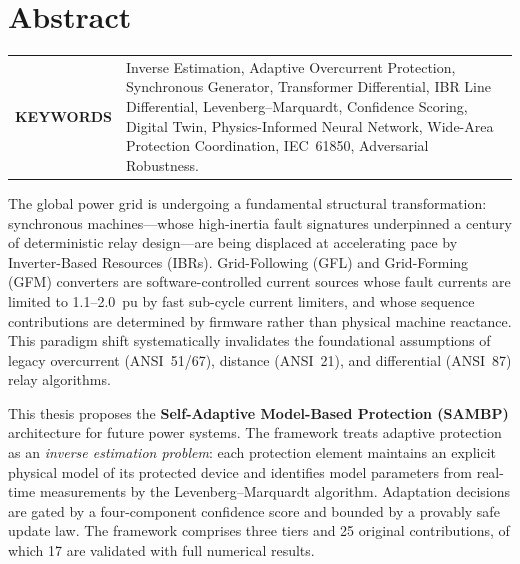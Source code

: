 \chapter{Abstract}

\begin{tabular}{@{} >{\bfseries}p{} p{} @{}}
\MakeUppercase{Keywords} &
Inverse Estimation, Adaptive Overcurrent Protection, Synchronous Generator,
Transformer Differential, IBR Line Differential, Levenberg--Marquardt,
Confidence Scoring, Digital Twin, Physics-Informed Neural Network,
Wide-Area Protection Coordination, IEC~61850, Adversarial Robustness.
\end{tabular}
\par

\begin{doublespacing}

The global power grid is undergoing a fundamental structural transformation:
synchronous machines---whose high-inertia fault signatures underpinned a century
of deterministic relay design---are being displaced at accelerating pace by
Inverter-Based Resources (IBRs). Grid-Following (GFL) and Grid-Forming (GFM)
converters are software-controlled current sources whose fault currents are
limited to 1.1--2.0~pu by fast sub-cycle current limiters, and whose sequence
contributions are determined by firmware rather than physical machine reactance.
This paradigm shift systematically invalidates the foundational assumptions of
legacy overcurrent (ANSI~51/67), distance (ANSI~21), and differential (ANSI~87)
relay algorithms.

This thesis proposes the \textbf{Self-Adaptive Model-Based Protection (SAMBP)}
architecture for future power systems. The framework treats adaptive protection
as an \emph{inverse estimation problem}: each protection element maintains an
explicit physical model of its protected device and identifies model parameters
from real-time measurements by the Levenberg--Marquardt algorithm. Adaptation
decisions are gated by a four-component confidence score and bounded by a
provably safe update law. The framework comprises three tiers and 25 original
contributions, of which 17 are validated with full numerical results.


\end{doublespacing}
